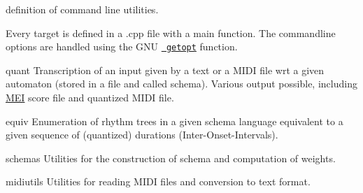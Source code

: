 definition of command line utilities.

Every {\ttfamily target} is defined in a .cpp file with a main function. The commandline options are handled using the G\+NU \href{https://www.gnu.org/software/libc/manual/html_node/Getopt.html}{\texttt{ getopt}} function.


\begin{DoxyItemize}
\item {\ttfamily quant} Transcription of an input given by a text or a M\+I\+DI file wrt a given automaton (stored in a file and called schema). Various output possible, including \mbox{\hyperlink{classMEI}{M\+EI}} score file and quantized M\+I\+DI file.
\item {\ttfamily equiv} Enumeration of rhythm trees in a given schema language equivalent to a given sequence of (quantized) durations (Inter-\/\+Onset-\/\+Intervals).
\item {\ttfamily schemas} Utilities for the construction of schema and computation of weights.
\item {\ttfamily midiutils} Utilities for reading M\+I\+DI files and conversion to text format. 
\end{DoxyItemize}